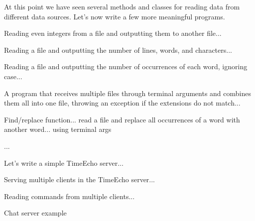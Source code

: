 At this point we have seen several methods and classes for reading data from different data sources. Let's now write a few more meaningful programs.

\example Reading even integers from a file and outputting them to another file...

\example Reading a file and outputting the number of lines, words, and characters...

\example Reading a file and outputting the number of occurrences of each word, ignoring case...

\example A program that receives multiple files through terminal arguments and combines them all into one file, throwing an exception if the extensions do not match...

\example Find/replace function... read a file and replace all occurrences of a word with another word... using terminal args

...


\example Let's write a simple TimeEcho server...

\example Serving multiple clients in the TimeEcho server...

\example Reading commands from multiple clients...

\example Chat server example



